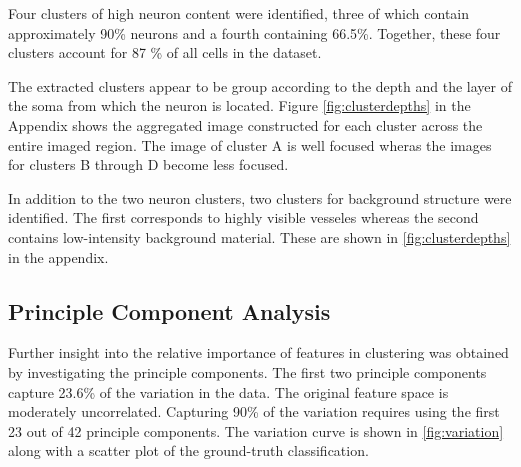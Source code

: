 \documentclass[10pt]{article}
\begin{document}
Four clusters of high neuron content were identified, three of which contain approximately \num{90}\% neurons and a fourth containing \num{66.5}\%. Together, these four clusters account for \num{87}
\% of all cells in the dataset.

The extracted clusters appear to be group according to the depth and the layer of the soma from which the neuron is located. 
Figure \cref{fig:clusterdepths} in the Appendix shows the aggregated image constructed for each cluster across the entire imaged region. 
The image of cluster A is well focused wheras the images for clusters B through D become less focused. 

In addition to the two neuron clusters, two clusters for background structure were identified. The first corresponds to highly visible vesseles whereas the second contains low-intensity background material. These are shown in \cref{fig:clusterdepths} in the appendix.


\subsection{Principle Component Analysis}

Further insight into the relative importance of features in clustering was obtained by investigating the principle components.
The first two principle components capture \num{23.6}\% of the variation in the data.
The original feature space is moderately uncorrelated.
Capturing \num{90}\% of the variation requires using the first \num{23} out of \num{42} principle components.
The variation curve is shown in \cref{fig:variation} along with a scatter plot of the ground-truth classification.
\end{document}

